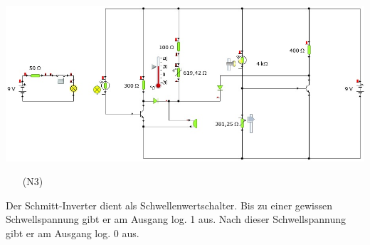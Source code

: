 \begin{Loesung}
\begin{center}
\includegraphics[scale=.7]{pics/TransistorKomplexN3}
\end{center}

\begin{itemize}
\item[(N3)] 
\end{itemize}

\end{Loesung}


\begin{Loesung}

Der Schmitt-Inverter dient als Schwellenwertschalter. Bis zu einer gewissen Schwellspannung gibt er am Ausgang log. 1 aus. Nach dieser Schwellspannung gibt er am Ausgang log. 0 aus.
\end{Loesung}